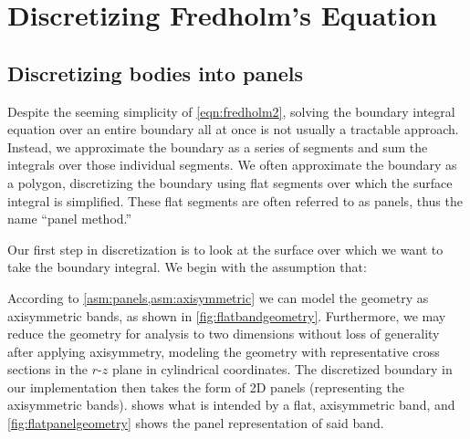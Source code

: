 \section{Discretizing Fredholm's Equation}
\label{ssec:panelmethodology}


\subsection{Discretizing bodies into panels}

Despite the seeming simplicity of \cref{eqn:fredholm2}, solving the boundary integral equation over an entire boundary all at once is not usually a tractable approach.
%
Instead, we approximate the boundary as a series of segments and sum the integrals over those individual segments.
%
We often approximate the boundary as a polygon, discretizing the boundary using flat segments over which the surface integral is simplified.
%
These flat segments are often referred to as panels, thus the name ``panel method.''

Our first step in discretization is to look at the surface over which we want to take the boundary integral.
%
We begin with the assumption that:

\begin{assumption}{}
    \label{asm:panels}




\end{assumption}


According to \cref{asm:panels,asm:axisymmetric} we can model the geometry as axisymmetric bands, as shown in \cref{fig:flatbandgeometry}.
%
Furthermore, we may reduce the geometry for analysis to two dimensions without loss of generality after applying axisymmetry, modeling the geometry with representative cross sections in the \(r\)-\(z\) plane in cylindrical coordinates.%
%
The discretized boundary in our implementation then takes the form of 2D panels (representing the axisymmetric bands).
%
 shows what is intended by a flat, axisymmetric band, and \cref{fig:flatpanelgeometry} shows the panel representation of said band.

